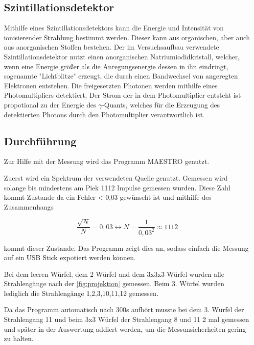\subsection{Szintillationsdetektor}
Mithilfe eines Szintillationsdetektors kann die Energie und Intensität von ionisierender Strahlung bestimmt werden. Dieser kann aus organischen, aber auch aus anorganischen Stoffen
bestehen. Der im Versuchsaufbau verwendete Szintillationsdetektor nutzt einen anorganischen Natriumiodidkristall, welcher, wenn eine Energie größer als die Anregungsenergie 
dessen in ihn eindringt, sogenannte "Lichtblitze" erzeugt, die durch einen Bandwechsel von angeregten Elektronen entstehen. Die freigesetzten Photonen werden mithilfe eines 
Photomultipliers detektiert. Der Strom der in dem Photomultiplier entsteht ist propotional zu der Energie des $\gamma$-Quants, welches für die Erzeugung des detektierten Photons
durch den Photomultiplier verantwortlich ist. 


\subsection{Durchführung}
Zur Hilfe mit der Messung wird das Programm MAESTRO genutzt.

\noindent
Zuerst wird ein Spektrum der verwendeten Quelle genutzt. Gemessen wird solange bis mindestens am Piek 1112 Impulse gemessen wurden. Diese Zahl kommt Zustande da ein Fehler < 0,03
gewünscht ist und mithilfe des Zusammenhangs

\begin{equation}
    \frac{\sqrt{N}}{N} = 0,03 \leftrightarrow N = \frac{1}{0,03^2} \approx 1112
    \label{eqn:n}
  \end{equation}
  
kommt dieser Zustande. Das Programm zeigt dies an, sodass einfach die Messung auf ein USB Stick expotiert werden können.

\noindent
Bei dem leeren Würfel, dem 2 Würfel und dem 3x3x3 Würfel wurden alle Strahlengänge nach der \autoref{fig:projektion} gemessen. Beim 3. Würfel wurden lediglich die Strahlengänge
1,2,3,10,11,12 gemessen. 

\noindent
Da das Programm automatisch nach 300s aufhört musste bei dem 3. Würfel der Strahlengang 11 und beim 3x3 Würfel der Strahlengang 8 und 11 2 mal gemessen und später in der
Auswertung addiert werden, um die Messunsicherheiten gering zu halten.












